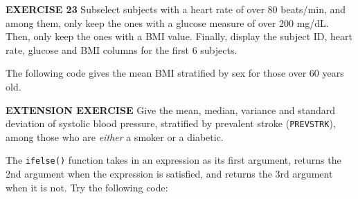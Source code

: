 \documentclass[
]{article}
\newenvironment{Shaded}{\begin{snugshade}}{\end{snugshade}}
\newcommand{\CommentTok}[1]{\textcolor[rgb]{0.56,0.35,0.01}{\textit{#1}}}
\newcommand{\DataTypeTok}[1]{\textcolor[rgb]{0.13,0.29,0.53}{#1}}
\newcommand{\DecValTok}[1]{\textcolor[rgb]{0.00,0.00,0.81}{#1}}
\newcommand{\KeywordTok}[1]{\textcolor[rgb]{0.13,0.29,0.53}{\textbf{#1}}}
\newcommand{\NormalTok}[1]{#1}
\newcommand{\OperatorTok}[1]{\textcolor[rgb]{0.81,0.36,0.00}{\textbf{#1}}}
\newcommand{\OtherTok}[1]{\textcolor[rgb]{0.56,0.35,0.01}{#1}}
\newcommand{\StringTok}[1]{\textcolor[rgb]{0.31,0.60,0.02}{#1}}
\begin{document}
\textbf{EXERCISE 23} Subselect subjects with a heart rate of over 80
beats/min, and among them, only keep the ones with a glucose measure of
over 200 mg/dL. Then, only keep the ones with a BMI value. Finally,
display the subject ID, heart rate, glucose and BMI columns for the
first 6 subjects.

\begin{Shaded}
\end{Shaded}

The following code gives the mean BMI stratified by sex for those over
60 years old.

\begin{Shaded}
\end{Shaded}

\textbf{EXTENSION EXERCISE} Give the mean, median, variance and standard
deviation of systolic blood pressure, stratified by prevalent stroke
(\texttt{PREVSTRK}), among those who are \emph{either} a smoker or a
diabetic.

The \texttt{ifelse()} function takes in an expression as its first
argument, returns the 2nd argument when the expression is satisfied, and
returns the 3rd argument when it is not. Try the following code:
\end{document}
